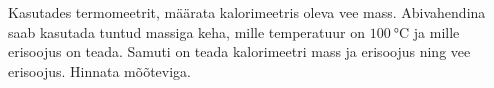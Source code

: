 Kasutades termomeetrit, määrata kalorimeetris oleva vee mass. Abivahendina
saab kasutada tuntud massiga keha, mille temperatuur on
$\SI{100}{\celsius}$ ja mille erisoojus on teada. Samuti on teada
kalorimeetri mass ja erisoojus ning vee erisoojus. Hinnata mõõteviga.
